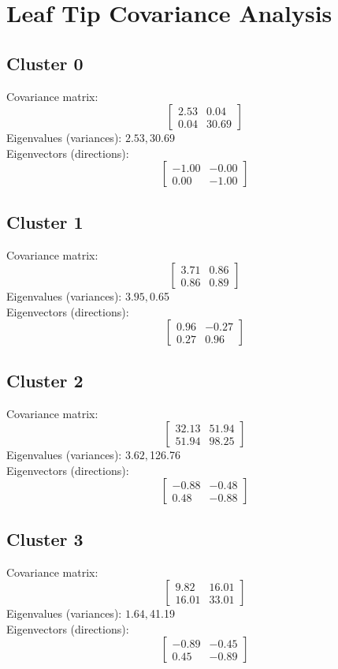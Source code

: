 \documentclass{article}
\begin{document}
\section*{Leaf Tip Covariance Analysis}
\subsection*{Cluster 0}
Covariance matrix:
\[\begin{bmatrix}2.53 & 0.04 \\0.04 & 30.69\end{bmatrix}\]
Eigenvalues (variances): $ 2.53, $30.69\\
Eigenvectors (directions):
\[\begin{bmatrix}-1.00 & -0.00 \\0.00 & -1.00\end{bmatrix}\]
\subsection*{Cluster 1}
Covariance matrix:
\[\begin{bmatrix}3.71 & 0.86 \\0.86 & 0.89\end{bmatrix}\]
Eigenvalues (variances): $ 3.95, $0.65\\
Eigenvectors (directions):
\[\begin{bmatrix}0.96 & -0.27 \\0.27 & 0.96\end{bmatrix}\]
\subsection*{Cluster 2}
Covariance matrix:
\[\begin{bmatrix}32.13 & 51.94 \\51.94 & 98.25\end{bmatrix}\]
Eigenvalues (variances): $ 3.62, $126.76\\
Eigenvectors (directions):
\[\begin{bmatrix}-0.88 & -0.48 \\0.48 & -0.88\end{bmatrix}\]
\subsection*{Cluster 3}
Covariance matrix:
\[\begin{bmatrix}9.82 & 16.01 \\16.01 & 33.01\end{bmatrix}\]
Eigenvalues (variances): $ 1.64, $41.19\\
Eigenvectors (directions):
\[\begin{bmatrix}-0.89 & -0.45 \\0.45 & -0.89\end{bmatrix}\]
\end{document}
